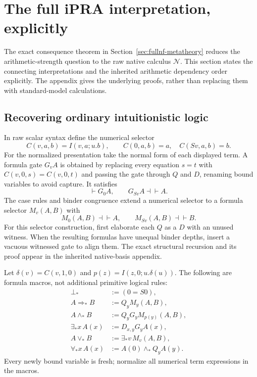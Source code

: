 \section{The full iPRA interpretation, explicitly}
\label{sec:interpretations}

The exact consequence theorem in Section~\ref{sec:fullnf-metatheory}
reduces the arithmetic-strength question to the raw native calculus
$\mathcal N$. This section states the connecting interpretations and
the inherited arithmetic dependency order explicitly. The appendix gives
the underlying proofs, rather than replacing them with standard-model
calculations.

\subsection{Recovering ordinary intuitionistic logic}

In raw scalar syntax define the numerical selector
\[
 C(v,a,b)=I(v,a;u.b),
 \qquad C(0,a,b)=a,\quad C(Sv,a,b)=b.
\]
For the normalized presentation take the normal form of each displayed
term. A formula gate $G_v A$ is obtained by replacing every equation
$s=t$ with $C(v,0,s)=C(v,0,t)$ and passing the gate through $Q$ and $D$,
renaming bound variables to avoid capture.
It satisfies
\[
 \vdash G_0A,\qquad G_{Sv}A\dashv\vdash A.
\]
The case rules and binder congruence extend a numerical selector to a
formula selector $M_v(A,B)$ with
\[
 M_0(A,B)\dashv\vdash A,\qquad M_{Sv}(A,B)\dashv\vdash B.
\]
For this selector construction, first elaborate each $Q$ as a $D$ with
an unused witness. When the resulting formulas have unequal binder depths,
insert a vacuous witnessed gate to align them. The exact structural recursion and its
proof appear in the inherited native-basis appendix.

Let $\delta(v)=C(v,1,0)$ and $p(z)=I(z,0;u.\delta(u))$.
The following are formula macros, not additional primitive logical rules:
\begin{align*}
 \bot_* &:= (0=S0),\\
 A\Rightarrow_* B&:=Q_y M_y(A,B),\\
 A\wedge_*B&:=Q_y G_yM_{p(y)}(A,B),\\
 \exists_*x\,A(x)&:=D_{x,y}G_yA(x),\\
 A\vee_*B&:=\exists_*v\,M_v(A,B),\\
 \forall_*x\,A(x)&:=A(0)\wedge_*Q_yA(y).
\end{align*}
Every newly bound variable is fresh; normalize all numerical term
expressions in the macros.

